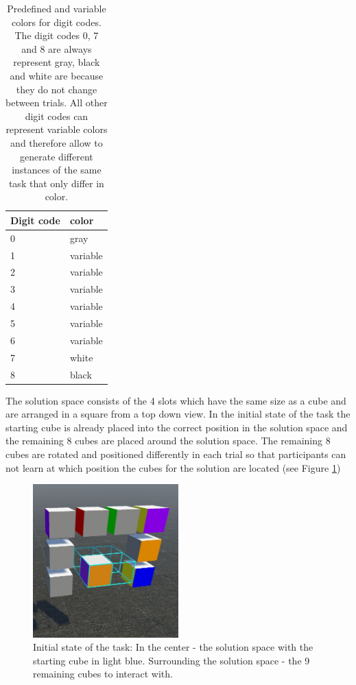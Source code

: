 \documentclass{article}
\begin{document}
\begin{table}
\begin{center}
    \begin{tabular}{| l | l |}
    \hline
    Digit code & color \\ \hline
    0 & gray \\ \hline
    1 & variable \\ \hline
    2 & variable \\ \hline
    3 & variable \\ \hline
    4 & variable \\ \hline
    5 & variable \\ \hline
    6 & variable \\ \hline
    7 & white \\ \hline
    8 & black \\ \hline
    \end{tabular}
\end{center}
\caption{Predefined and variable colors for digit codes. The digit codes 0, 7 and 8 are always represent gray, black and white are because they do not change between trials. All other digit codes can represent variable colors and therefore allow to generate different instances of the same task that only differ in color. }
\label{tab:color_mapping}
\end{table}

The solution space consists of the 4 slots which have the same size as a cube and are arranged in a square from a top down view. In the initial state of the task the starting cube is already placed into the correct position in the solution space and the remaining 8 cubes are placed around the solution space. The remaining 8 cubes are rotated and positioned differently in each trial so that participants can not learn at which position the cubes for the solution are located (see Figure \ref{fig:vr_task_initialstate})

\begin{figure}[h]
\centering
\includegraphics[width=0.5\textwidth]{vr_task_initialstate}
\caption{Initial state of the task: In the center - the solution space with the starting cube in light blue. Surrounding the solution space - the 9 remaining cubes to interact with. }
\label{fig:vr_task_initialstate}
\end{figure}
\end{document}

